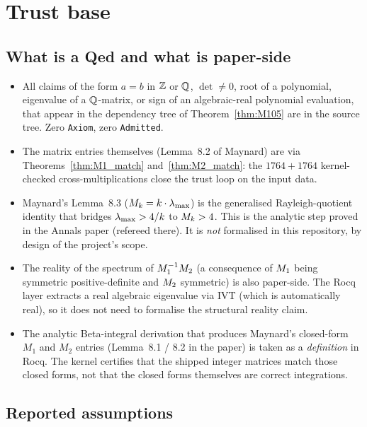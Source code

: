 \chapter{Trust base}\label{ch:trust}

\section{What is a Qed and what is paper-side}

\begin{itemize}
\item All claims of the form
  $a = b$ in $\mathbb{Z}$ or $\mathbb{Q}$, $\det \ne 0$, root of a polynomial,
  eigenvalue of a $\mathbb{Q}$-matrix, or sign of an algebraic-real polynomial
  evaluation, that appear in the dependency tree of
  Theorem~\ref{thm:M105} are \Qed{} in the source tree.
  Zero \texttt{Axiom}, zero \texttt{Admitted}.
\item The matrix entries themselves (Lemma~8.2 of Maynard) are
  \Qed{} via Theorems~\ref{thm:M1_match} and~\ref{thm:M2_match}: the
  $1764 + 1764$ kernel-checked cross-multiplications close the trust
  loop on the input data.
\item Maynard's Lemma~8.3 ($M_k = k \cdot \lambda_{\max}$) is the
  generalised Rayleigh-quotient identity that bridges
  $\lambda_{\max} > 4/k$ to $M_k > 4$. This is the analytic step proved in
  the Annals paper (refereed there). It is \emph{not} formalised
  in this repository, by design of the project's scope.
\item The reality of the spectrum of $M_1^{-1}M_2$ (a consequence
  of $M_1$ being symmetric positive-definite and $M_2$ symmetric)
  is also paper-side. The Rocq layer extracts a real algebraic
  eigenvalue via IVT (which is automatically real), so it does not
  need to formalise the structural reality claim.
\item The analytic Beta-integral derivation that produces Maynard's
  closed-form $M_1$ and $M_2$ entries (Lemma~8.1 / 8.2 in the paper) is
  taken as a \emph{definition} in Rocq. The kernel certifies that the
  shipped integer matrices match those closed forms, not that the
  closed forms themselves are correct integrations.
\end{itemize}

\section{Reported assumptions}

